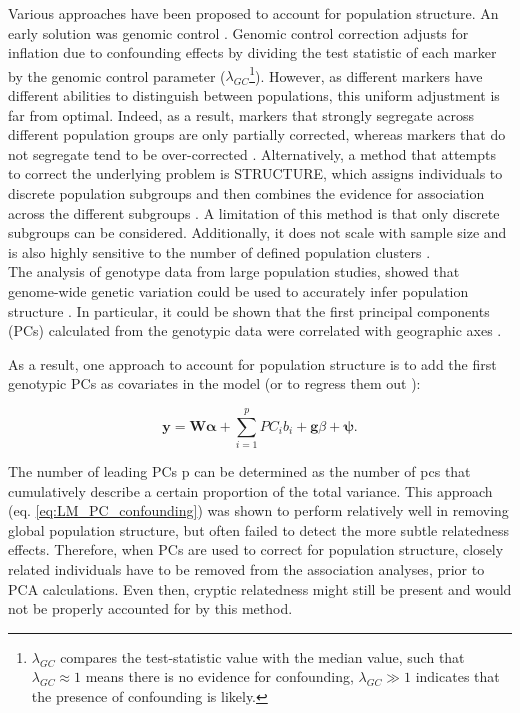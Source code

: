 Various approaches have been proposed to account for population structure.
An early solution was genomic control \cite{devlin1999genomic}.
Genomic control correction adjusts for inflation due to confounding effects by dividing the test statistic of each marker by the genomic control parameter ($\lambda_{GC}$\footnote{$\lambda_{GC}$ compares the test-statistic value with the median value, such that $\lambda_{GC} \approx 1$ means there is no evidence for confounding, $\lambda_{GC} \gg 1$ indicates that the presence of confounding is likely.}). 
However, as different markers have different abilities to distinguish between populations, this uniform adjustment is far from optimal. 
Indeed, as a result, markers that strongly segregate across different population groups are only partially corrected, whereas markers that do not segregate tend to be over-corrected \cite{marchini2004effects, price2006principal}.
Alternatively, a method that attempts to correct the underlying problem is STRUCTURE, which assigns individuals to discrete population subgroups and then combines the evidence for association across the different subgroups \cite{pritchard2000inference}. 
A limitation of this method is that only discrete subgroups can be considered. 
Additionally, it does not scale with sample size and is also highly sensitive to the number of defined population clusters \cite{price2006principal}.\\

The analysis of genotype data from large population studies, showed that genome-wide genetic variation could be used to
accurately infer population structure 
\cite{li2008worldwide, tian2008analysis, price2008discerning}.
In particular, it could be shown that the first principal components (PCs) calculated from the genotypic data were correlated with geographic axes \cite{novembre2008interpreting}.

As a result, one approach to account for population structure is to add the first genotypic PCs as covariates in the model (or to regress them out \cite{price2006principal}): 

\begin{equation}\label{eq:LM_PC_confounding}
    \mathbf{y} =  \mathbf{W}\boldsymbol{\alpha} + \sum_{i=1}^{p} PC_i b_i + \mathbf{g}\beta + \boldsymbol{\psi}. 
\end{equation}

The number of leading PCs p can be determined as the number of \gls{pc}s that cumulatively describe a certain proportion of the total variance.
This approach (eq. \eqref{eq:LM_PC_confounding}) was shown to perform relatively well in removing global population structure, but often failed to detect the more subtle relatedness effects.
Therefore, when PCs are used to correct for population structure, closely related individuals have to be removed from the association analyses, prior to PCA calculations.
Even then, cryptic relatedness might still be present and would not be properly accounted for by this method. 

